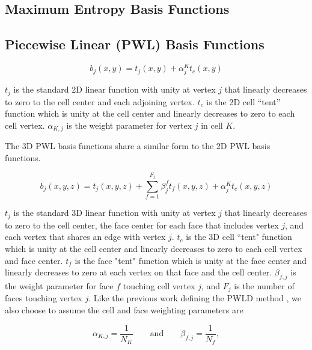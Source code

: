 \subsection{Maximum Entropy Basis Functions}
\label{sec::BF_Linear_ME}

\subsection{Piecewise Linear (PWL) Basis Functions}
\label{sec::BF_Linear_PWL}

\begin{equation}
\label{eq::PWL_2D}
	b_j (x,y) = t_j (x,y) + \alpha_j^K t_c (x,y)
\end{equation}

\noindent $t_j$ is the standard 2D linear function with unity at vertex $j$ that linearly decreases to zero to the cell center and each adjoining vertex. $t_c$ is the 2D cell ``tent'' function which is unity at the cell center and linearly decreases to zero to each cell vertex. $\alpha_{K,j}$ is the weight parameter for vertex $j$ in cell $K$.

The 3D PWL basis functions share a similar form to the 2D PWL basis functions.

\begin{equation}
\label{eq::PWL_3D}
	b_j (x,y,z)  = t_j  (x,y,z) + \sum_{f=1}^{F_j} \beta_j^f  t_f (x,y,z) + \alpha_j^K t_c  (x,y,z)
\end{equation}

\noindent $t_j$ is the standard 3D linear function with unity at vertex $j$ that linearly decreases to zero to the cell center, the face center for each face that includes vertex $j$, and each vertex that shares an edge with vertex $j$. $t_c$ is the 3D cell ``tent" function which is unity at the cell center and linearly decreases to zero to each cell vertex and face center. $t_f$ is the face "tent" function which is unity at the face center and linearly decreases to zero at each vertex on that face and the cell center. $\beta_{f,j}$ is the weight parameter for face $f$ touching cell vertex $j$, and $F_j$ is the number of faces touching vertex $j$. Like the previous work defining the PWLD method \cite{bailey2008phd}, we also choose to assume the cell and face weighting parameters are

\begin{equation}
\alpha_{K,j} = \frac{1}{N_K} \qquad \text{and} \qquad \beta_{f,j} = \frac{1}{N_f},
\label{eq::PWL_weight_vals}
\end{equation}

